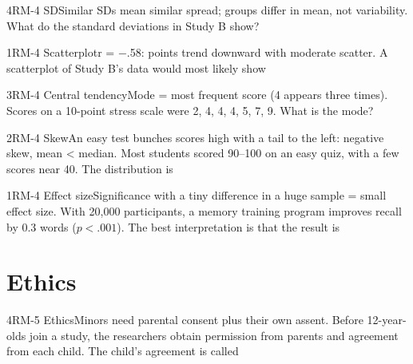 \documentclass[11pt]{article}
\begin{document}
\begin{q}{4}{RM-4 SD}{Similar SDs mean similar spread; groups differ in mean, not variability.}
What do the standard deviations in Study B show?
\end{q}

\begin{q}{1}{RM-4 Scatterplot}{r = −.58: points trend downward with moderate scatter.}
A scatterplot of Study B's data would most likely show
\end{q}

\begin{q}{3}{RM-4 Central tendency}{Mode = most frequent score (4 appears three times).}
Scores on a 10-point stress scale were 2, 4, 4, 4, 5, 7, 9. What is the mode?
\end{q}

\begin{q}{2}{RM-4 Skew}{An easy test bunches scores high with a tail to the left: negative skew, mean < median.}
Most students scored 90--100 on an easy quiz, with a few scores near 40. The distribution is
\end{q}

\begin{q}{1}{RM-4 Effect size}{Significance with a tiny difference in a huge sample = small effect size.}
With 20{,}000 participants, a memory training program improves recall by 0.3 words (\(p < .001\)). The best interpretation is that the result is
\end{q}

\section{Ethics}

\begin{q}{4}{RM-5 Ethics}{Minors need parental consent plus their own assent.}
Before 12-year-olds join a study, the researchers obtain permission from parents and agreement from each child. The child's agreement is called
\end{q}
\end{document}
